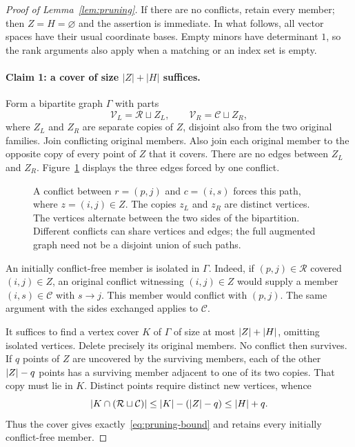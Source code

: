 \begin{proof}[Proof of Lemma~\ref{lem:pruning}]
If there are no conflicts, retain every member; then $Z=H=\varnothing$
and the assertion is immediate.  In what follows, all vector spaces have
their usual coordinate bases.  Empty minors have determinant $1$, so the
rank arguments also apply when a matching or an index set is empty.

\paragraph{Claim 1: a cover of size $|Z|+|H|$ suffices.}
Form a bipartite graph $\Gamma$ with parts
\[
 \mathcal V_L=\mathcal R\sqcup Z_L,
 \qquad
 \mathcal V_R=\mathcal C\sqcup Z_R,
\]
where $Z_L$ and $Z_R$ are separate copies of $Z$, disjoint also from the
two original families.  Join conflicting original members.  Also join
each original member to the opposite copy of every point of $Z$ that it
covers.  There are no edges between $Z_L$ and $Z_R$.
Figure~\ref{fig:pruning} displays the three edges forced by one conflict.

\begin{figure}[!ht]
 \centering
 
 \caption{A conflict between $r=(p,j)$ and $c=(i,s)$ forces this path,
 where $z=(i,j)\in Z$.  The copies $z_L$ and $z_R$ are distinct vertices.
 The vertices alternate between the two sides of the bipartition.
 Different conflicts can share vertices and edges; the full augmented
 graph need not be a disjoint union of such paths.}
 \label{fig:pruning}
\end{figure}

An initially conflict-free member is isolated in $\Gamma$.
Indeed, if $(p,j)\in\mathcal R$ covered $(i,j)\in Z$, an original
conflict witnessing $(i,j)\in Z$ would supply a member
$(i,s)\in\mathcal C$ with $s\to j$.  This member would conflict with
$(p,j)$.  The same argument with the sides exchanged applies to
$\mathcal C$.

It suffices to find a vertex cover $K$ of $\Gamma$ of size at most
$\lvert Z\rvert+\lvert H\rvert$, omitting isolated vertices.  Delete precisely its
original members.  No conflict then survives.  If $q$ points of $Z$ are
uncovered by the surviving members, each of the other $\lvert Z\rvert-q$ points
has a surviving member adjacent to one of its two copies.  That copy
must lie in $K$.  Distinct points require distinct new vertices, whence
\begin{equation}\label{eq:cover-charge}
 \lvert K\cap(\mathcal R\sqcup\mathcal C)\rvert
 \leq \lvert K\rvert-(\lvert Z\rvert-q)\leq\lvert H\rvert+q.
\end{equation}
Thus the cover gives exactly~\eqref{eq:pruning-bound} and retains every
initially conflict-free member.


\end{proof}
